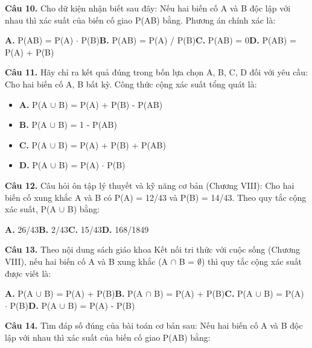 \documentclass[11pt,a4paper]{article}
\begin{document}
\textbf{\color{primary} Câu 10.} Cho dữ kiện nhận biết sau đây: Nếu hai biến cố A và B độc lập với nhau thì xác suất của biến cố giao P(AB) bằng. Phương án chính xác là:\par
\hspace*{1.5em}\textbf{A.} P(AB) = P(A) $\cdot$ P(B)\quad\quad \textbf{B.} P(AB) = P(A) / P(B)\quad\quad \textbf{C.} P(AB) = 0\quad\quad \textbf{D.} P(AB) = P(A) + P(B)\par\vspace{2pt}
\textbf{\color{primary} Câu 11.} Hãy chỉ ra kết quả đúng trong bốn lựa chọn A, B, C, D đối với yêu cầu: Cho hai biến cố A, B bất kỳ. Công thức cộng xác suất tổng quát là:\par
\begin{itemize}\setlength{\itemsep}{1pt}\setlength{\parskip}{0pt}
  \item[] \textbf{A.} P(A $\cup$ B) = P(A) + P(B) - P(AB)
  \item[] \textbf{B.} P(A $\cup$ B) = 1 - P(AB)
  \item[] \textbf{C.} P(A $\cup$ B) = P(A) + P(B) + P(AB)
  \item[] \textbf{D.} P(A $\cup$ B) = P(A) $\cdot$ P(B)
\end{itemize}\vspace{2pt}
\textbf{\color{primary} Câu 12.} Câu hỏi ôn tập lý thuyết và kỹ năng cơ bản (Chương VIII): Cho hai biến cố xung khắc A và B có P(A) = 12/43 và P(B) = 14/43. Theo quy tắc cộng xác suất, P(A $\cup$ B) bằng:\par
\hspace*{1.5em}\textbf{A.} 26/43\quad\quad \textbf{B.} 2/43\quad\quad \textbf{C.} 15/43\quad\quad \textbf{D.} 168/1849\par\vspace{2pt}
\textbf{\color{primary} Câu 13.} Theo nội dung sách giáo khoa Kết nối tri thức với cuộc sống (Chương VIII), nếu hai biến cố A và B xung khắc (A $\cap$ B = $\emptyset$) thì quy tắc cộng xác suất được viết là:\par
\hspace*{1.5em}\textbf{A.} P(A $\cup$ B) = P(A) + P(B)\quad\quad \textbf{B.} P(A $\cap$ B) = P(A) + P(B)\quad\quad \textbf{C.} P(A $\cup$ B) = P(A) $\cdot$ P(B)\quad\quad \textbf{D.} P(A $\cup$ B) = P(A) - P(B)\par\vspace{2pt}
\textbf{\color{primary} Câu 14.} Tìm đáp số đúng của bài toán cơ bản sau: Nếu hai biến cố A và B độc lập với nhau thì xác suất của biến cố giao P(AB) bằng:\par
\end{document}
